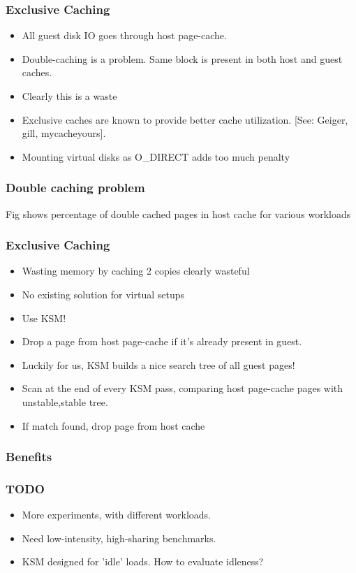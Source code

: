 \documentclass{beamer}
\begin{document}
\begin{frame}
  \frametitle{Exclusive Caching}
  \begin{itemize}
  \item All guest disk IO goes through host page-cache.
  \item Double-caching is a problem. Same block is present in both host and guest caches.
  \item Clearly this is a waste
  \item Exclusive caches are known to provide better cache utilization. [See: Geiger, gill, mycacheyours].
  \item Mounting virtual disks as O_DIRECT adds too much penalty
  \end{itemize}
\end{frame}

\begin{frame}
  \frametitle{Double caching problem}
  {Fig shows percentage of double cached pages in host cache for various workloads}
\end{frame}

\begin{frame}
  \frametitle{Exclusive Caching}
  \begin{itemize}

  \item {Wasting memory by caching 2 copies clearly wasteful}
  \item {No existing solution for virtual setups}
  \item \alert{Use KSM!}
  \item Drop a page from host page-cache if it's already present in guest.
  \item Luckily for us, KSM builds a nice search tree of all guest pages!
  \item Scan at the end of every KSM pass, comparing host page-cache pages with unstable,stable tree.
 \item If match found, drop page from host cache
 \end{itemize}
\end{frame}

\begin{frame}
  \frametitle{Benefits}
\end{frame}


\begin{frame}
  \frametitle{TODO}
  \begin{itemize}
  \item More experiments, with different workloads.
  \item Need low-intensity, high-sharing benchmarks. 
  \item KSM designed for 'idle' loads. How to evaluate idleness?
  \end{itemize}
\end{frame}
\end{document}
